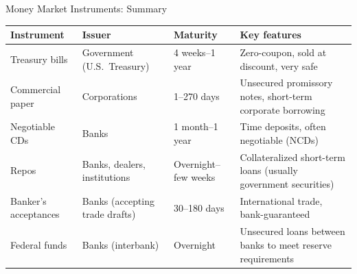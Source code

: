 \documentclass[aspectratio=169]{beamer}
\begin{document}
\begin{frame}{Money Market Instruments: Summary}
\begin{table}
\centering
\small
\begin{tabular}{p{}p{}p{}p{}}
\toprule
\textbf{Instrument} & \textbf{Issuer} & \textbf{Maturity} & \textbf{Key features} \\
\midrule
Treasury bills & Government (U.S.\ Treasury) & 4 weeks--1 year & Zero-coupon, sold at discount, very safe \\
Commercial paper & Corporations & 1--270 days & Unsecured promissory notes, short-term corporate borrowing \\
Negotiable CDs & Banks & 1 month--1 year & Time deposits, often negotiable (NCDs) \\
Repos & Banks, dealers, institutions & Overnight--few weeks & Collateralized short-term loans (usually government securities) \\
Banker's acceptances & Banks (accepting trade drafts) & 30--180 days & International trade, bank-guaranteed \\
Federal funds & Banks (interbank) & Overnight & Unsecured loans between banks to meet reserve requirements \\
\bottomrule
\end{tabular}
\end{table}
\end{frame}
\end{document}
